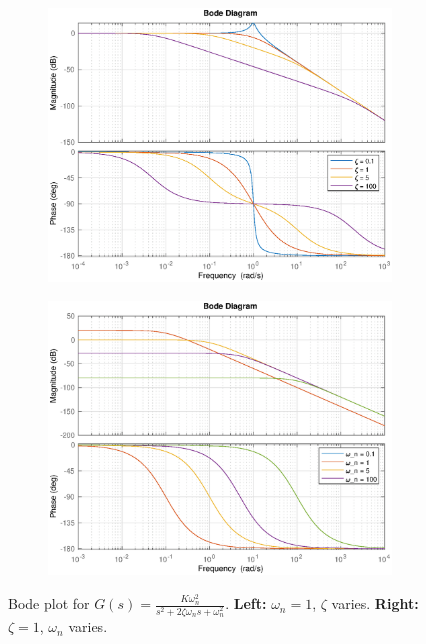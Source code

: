 \documentclass[12pt,a4paper]{article}
\begin{document}
\begin{figure}[H]
\hspace{-1.6cm}
\begin{minipage}{0.5\textwidth}
\begin{figure}[H] \centering 
\includegraphics[width=1.2\textwidth]{images/bode_6.eps}
\end{figure}
\end{minipage}\hfill \hspace{-1.6cm}
\begin{minipage}{.5\textwidth}
\begin{figure}[H] \centering
\includegraphics[width=1.2\textwidth]{images/bode_7.eps}
\end{figure}
\end{minipage}
\caption{Bode plot for $G(s) = \frac{K\omega_{n}^{2}}{s^{2}+2\zeta\omega_{n}s+\omega_{n}^{2}}$. \textbf{Left:} $\omega_{n}=1$, $\zeta$ varies. \textbf{Right:} $\zeta=1$, $\omega_{n}$ varies.}
\end{figure}
\end{document}
